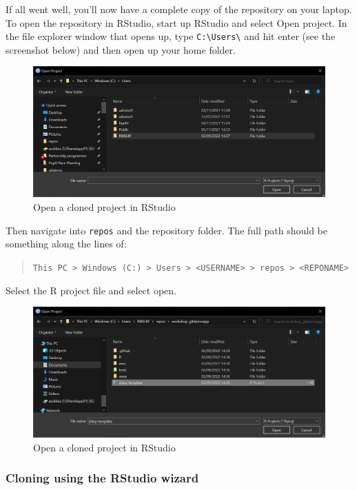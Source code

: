 \documentclass[
  12pt,
]{article}
\begin{document}
If all went well, you'll now have a complete copy of the repository on
your laptop. To open the repository in RStudio, start up RStudio and
select Open project. In the file explorer window that opens up, type
\texttt{C:\textbackslash{}Users\textbackslash{}} and hit enter (see the
screenshot below) and then open up your home folder.

\begin{figure}
\includegraphics[width=0.6\linewidth]{images/gitdemo/gitdemo-RStudio_OpenProj} \caption{Open a cloned project in RStudio}\label{fig:unnamed-chunk-4}
\end{figure}

Then navigate into \texttt{repos} and the repository folder. The full
path should be something along the lines of:

\begin{quote}
\texttt{This\ PC\ \textgreater{}\ Windows\ (C:)\ \textgreater{}\ Users\ \textgreater{}\ \textless{}USERNAME\textgreater{}\ \textgreater{}\ repos\ \textgreater{}\ \textless{}REPONAME\textgreater{}}
\end{quote}

Select the R project file and select open.

\begin{figure}
\includegraphics[width=0.6\linewidth]{images/gitdemo/gitdemo-RStudio_OpenProj_fullpath} \caption{Open a cloned project in RStudio}\label{fig:unnamed-chunk-5}
\end{figure}

\hypertarget{cloning-using-the-rstudio-wizard}{%
\subsubsection{Cloning using the RStudio
wizard}\label{cloning-using-the-rstudio-wizard}}
\end{document}
